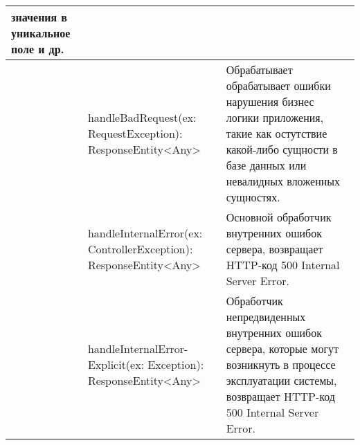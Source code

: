 \begin{center}
\begin{longtable}{ 
      | >{\centering}m{} 
      | >{\centering}m{} 
      | >{\centering\arraybackslash}m{}|}
  	значения в уникальное поле и др.\\
  \cline{2-3}
  	& handleBadRequest(ex: RequestException): ResponseEntity<Any>
  	& Обрабатывает обрабатывает ошибки нарушения бизнес логики приложения, такие как остутствие какой-либо сущности
  	в базе данных или невалидных вложенных сущностях. \\
  \cline{2-3}
  	& handleInternalError(ex: ControllerException): ResponseEntity<Any>
  	& Основной обработчик внутренних ошибок сервера, возвращает HTTP-код 500 Internal Server Error. \\
  \cline{2-3}
  	& handleInternalError-Explicit(ex: Exception): ResponseEntity<Any>
  	& Обработчик непредвиденных внутренних ошибок сервера, которые могут возникнуть в процессе эксплуатации системы, 
  	возвращает HTTP-код 500 Internal Server Error. \\
  \end{longtable}
\end{center}

